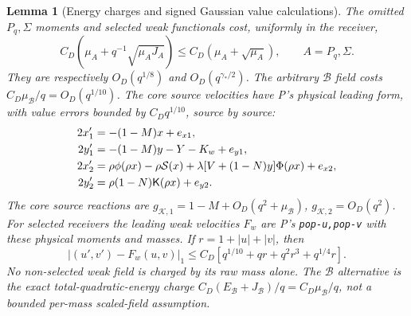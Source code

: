 \documentclass[11pt]{article}
\numberwithin{equation}{section}
\newtheorem{lemma}[theorem]{Lemma}
\newcommand{\KK}{\mathcal K}\newcommand{\BB}{\mathcal B}
\newcommand{\Kfun}{\mathsf K}\newcommand{\Ffun}{\mathsf F}
\begin{document}
\begin{lemma}[Energy charges and signed Gaussian value calculations]
\label{an07fwcv1:charges}
The omitted \(P_q,\Sigma\) moments and selected weak functionals
cost, uniformly in the receiver,
\begin{equation}
 C_D(\mu_A+q^{-1}\sqrt{\mu_AJ_A})
 \le C_D(\mu_A+\sqrt{\mu_A}),\qquad A=P_q,\Sigma.
 \label{an07fwcv1:nonselectedcharge}
\end{equation}
They are respectively \(O_D(q^{1/8})\) and
\(O_D(q^{\gamma_*/2})\). The arbitrary \(\BB\) field costs
\(C_D\mu_\BB/q=O_D(q^{1/10})\).
The core source velocities have P's physical leading form,
with value errors bounded by \(C_Dq^{1/10}\), source by source:
\begin{align}
 2x'_1&=-(1-M)x+e_{x1},\notag\\
 2y'_1&=-(1-M)y-Y-K_w+e_{y1},\notag\\
 2x'_2&=\rho\phi(\rho x)-\rho\mathcal S(x)
       +\lambda[V+(1-N)y]\Phi(\rho x)+e_{x2},\notag\\
 2y'_2&=\rho(1-N)\Kfun(\rho x)+e_{y2}.
 \label{an07fwcv1:corefield}
\end{align}
The core source reactions are
\(g_{\KK,1}=1-M+O_D(q^2+\mu_\BB)\),
\(g_{\KK,2}=O_D(q^2)\).
For selected receivers the leading weak velocities \(F_w\)
are P's \texttt{pop-u,pop-v} with these physical moments and
masses. If \(r=1+|u|+|v|\), then
\begin{equation}
 |(u',v')-F_w(u,v)|_1
 \le C_D[q^{1/10}+q r+q^2r^3+q^{1/4}r].
 \label{an07fwcv1:weakerror}
\end{equation}
No non-selected weak field is charged by its raw mass alone.
The \(\BB\) alternative is the exact total-quadratic-energy charge
\(C_D(E_\BB+J_\BB)/q=C_D\mu_\BB/q\), not a bounded
per-mass scaled-field assumption.
\end{lemma}
\end{document}
